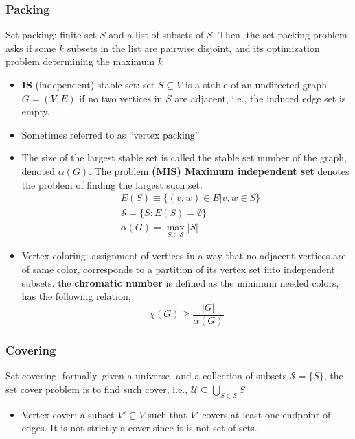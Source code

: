 \subsubsection*{Packing}
Set packing: finite set \(S\) and a list of subsets of \(S\). Then, the set packing problem asks if some \(k\) subsets in the list are pairwise disjoint, and its optimization problem determining the maximum \(k\)
\begin{itemize}
      \item \textbf{IS} (independent) stable set: set \(S \subseteq V\) is a stable of an
            undirected graph \(G = (V, E)\) if no two vertices in \(S\) are
            adjacent, i.e., the induced edge set is empty.
      \item Sometimes referred to as ``vertex packing''
      \item The size of the
            largest stable set is called the stable set number of the graph,
            denoted \(\alpha(G)\). The problem \textbf{(MIS) Maximum independent set} denotes the problem of finding the largest such set.
            \begin{equation}
                  \begin{aligned}
                         & E(S) \equiv \{(v, w) \in E | v, w \in S\} \\
                         & \mathscr S = \{S: E(S)= \emptyset\}       \\
                         & \alpha (G) = \max_{S\in \mathscr S} |S|
                  \end{aligned}
            \end{equation}

      \item Vertex coloring: assignment of vertices in a way that no adjacent vertices are of same color, corresponds to a partition of its vertex set into independent subsets. the \textbf{chromatic number} is defined as the minimum needed colors, has the following relation,
            \begin{equation}
                  \chi(G) \ge \frac{|G|}{\alpha(G)}
            \end{equation}
\end{itemize}

\subsubsection*{Covering}
Set covering, formally, given a universe \(\) and a collection of subsets \(\mathscr S = \{S\}\), the set cover problem is to find such cover, i.e., \(\mathscr U \subseteq \bigcup_{S\in\mathscr S} S \)
\begin{itemize}
      \item Vertex cover: a subset \(V' \subseteq V\) such that \(V'\) covers at least one endpoint of edges. It is not strictly a cover since it is not set of sets.
\end{itemize}

